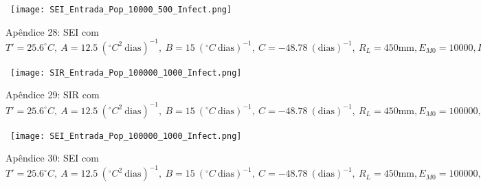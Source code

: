 \documentclass[
	12pt,				%
	oneside,			%
	a4paper,			%
	english,			%
	brazil				%
	]{abntex2}
\begin{document}
\begin{apendicesenv}
\begin{figure}[!ht]
\end{figure} 
\begin{figure}[!ht]
	\centering
	\hbox{\hspace{2.5em} \texttt{[image: SEI\_Entrada\_Pop\_10000\_500\_Infect.png]}}
	\caption*{Apêndice 28: SEI com $T'=25.6^\circ C, \ A=12.5 \ (^\circ C^2 \ \text{dias})^{-1}, \ B=15 \ (^\circ C \ \text{dias})^{-1}, \ C=-48.78 \ (\text{dias})^{-1}, \ R_L=450 \text{mm}, E_{M0}=10000, I_{H0}=500$} 
\end{figure} 
\newpage
\begin{figure}[!ht]
	\centering
	\hbox{\hspace{2.7em} \texttt{[image: SIR\_Entrada\_Pop\_100000\_1000\_Infect.png]}}
	\caption*{Apêndice 29: SIR com $T'=25.6^\circ C, \ A=12.5 \ (^\circ C^2 \ \text{dias})^{-1}, \ B=15 \ (^\circ C \ \text{dias})^{-1}, \ C=-48.78 \ (\text{dias})^{-1}, \ R_L=450 \text{mm}, E_{M0}=100000, I_{H0}=1000$} 
\end{figure} 
\begin{figure}[!ht]
	\centering
	\hbox{\hspace{2.5em} \texttt{[image: SEI\_Entrada\_Pop\_100000\_1000\_Infect.png]}}
	\caption*{Apêndice 30: SEI com $T'=25.6^\circ C, \ A=12.5 \ (^\circ C^2 \ \text{dias})^{-1}, \ B=15 \ (^\circ C \ \text{dias})^{-1}, \ C=-48.78 \ (\text{dias})^{-1}, \ R_L=450 \text{mm}, E_{M0}=100000, I_{H0}=1000$} 
\end{figure} 

\end{apendicesenv}




\printindex
\end{document}
